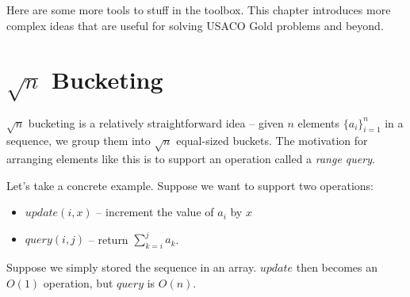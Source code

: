 \documentclass[11pt]{book}
\begin{document}
Here are some more tools to stuff in the toolbox. This chapter introduces more complex ideas that are useful for solving USACO Gold problems and beyond.

\section{$\sqrt{n}$ Bucketing}

$\sqrt{n}$ bucketing is a relatively straightforward idea -- given $n$ elements $\{a_i\}_{i=1}^n$ in a sequence, we group them into $\sqrt{n}$ equal-sized buckets. The motivation for arranging elements like this is to support an operation called a \textit{range query}.

Let's take a concrete example. Suppose we want to support two operations:

\begin{itemize}
\item
$update(i, x)$ -- increment the value of $a_i$ by $x$

\item
$query(i, j)$ -- return $\sum_{k=i}^j a_k$.
\end{itemize}

Suppose we simply stored the sequence in an array. $update$ then becomes an $O(1)$ operation, but $query$ is $O(n)$.

\begin{center}
{
}
\end{center}
\end{document}
